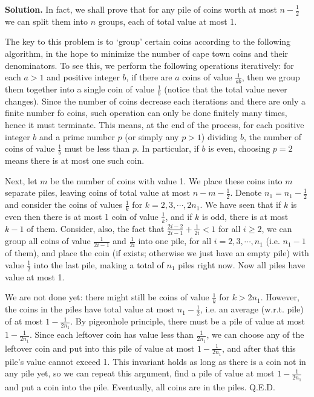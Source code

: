 \documentclass[11pt,a4paper]{article}
\begin{document}
\begin{enumerate}
	\textbf{Solution.} In fact, we shall prove that for any pile of coins worth at most $n-\frac 12$ we can split them into $n$ groups, each of total value at most 1. 
	
	The key to this problem is to `group' certain coins according to the following algorithm, in the hope to minimize the number of cape town coins and their denominators. To see this, we perform the following operations iteratively: for each $a>1$ and positive integer $b$, if there are $a$ coins of value $\frac {1}{ab}$, then we group them together into a single coin of value $\frac {1}{b}$ (notice that the total value never changes). Since the number of coins decrease each iterations and there are only a finite number fo coins, such operation can only be done finitely many times, hence it must terminate. This means, at the end of the process, for each positive integer $b$ and a prime number $p$ (or simply any $p>1$) dividing $b$, the number of coins of value $\frac{1}{b}$ must be less than $p$. In particular, if $b$ is even, choosing $p=2$ means there is at most one such coin. 
	
	Next, let $m$ be the number of coins with value 1. We place these coins into $m$ separate piles, leaving coins of total value at most $n-m-\frac 12$. Denote $n_1=n_1-\frac 12$ and consider the coins of values $\frac{1}{k}$ for $k=2, 3, \cdots , 2n_1$. 
	We have seen that if $k$ is even then there is at most 1 coin of value $\frac 1k$, and if $k$ is odd, there is at most $k-1$ of them. Consider, also, the fact that $\frac{2i-2}{2i-1}+\frac{1}{2i}<1$ for all $i\ge 2$, we can group all coins of value $\frac{1}{2i-1}$ and $\frac{1}{2i}$ into one pile, for all $i=2, 3, \cdots , n_1$ (i.e. $n_1-1$ of them), and place the coin (if exists; otherwise we just have an empty pile) with value $\frac 12$ into the last pile, making a total of $n_1$ piles right now. Now all piles have value at most 1. 
	
	We are not done yet: there might still be coins of value $\frac{1}{k}$ for $k>2n_1$. However, the coins in the piles have total value at most $n_1-\frac 12$, i.e. an average (w.r.t. pile) of at most $1-\frac{1}{2n_1}$. 
	By pigeonhole principle, there must be a pile of value at most $1-\frac{1}{2n_1}$. Since each leftover coin has value less than $\frac{1}{2n_1}$, we can choose any of the leftover coin and put into this pile of value at most $1-\frac{1}{2n_1}$, and after that this pile's value cannot exceed 1. This invariant holds as long as there is a coin not in any pile yet, so we can repeat this argument, find a pile of value at most $1-\frac{1}{2n_1}$ and put a coin into the pile. Eventually, all coins are in the piles. Q.E.D. 
	

\end{enumerate}
\end{document}
